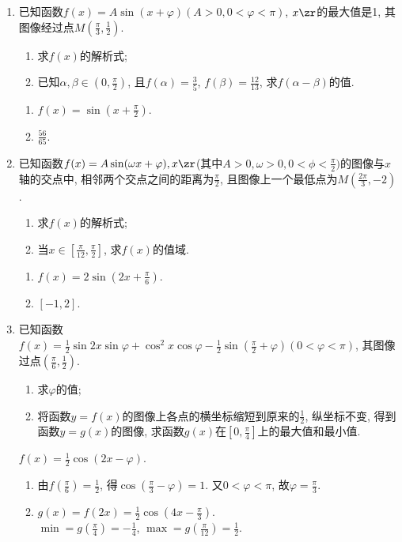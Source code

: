 \begin{enumerate}
\item 已知函数$f(x)=A\sin(x+\varphi)(A>0, 0<\varphi<\pi)$, $x\zr$的最大值是1, 其图像经过点$M\left(\frac{\pi}{3},\frac{1}{2}\right)$. 
\begin{enumerate}
\item 求$f(x)$的解析式; 
\item 已知$\alpha,\beta\in\left(0,\frac{\pi}{2}\right)$, 且$f(\alpha)=\frac{3}{5}$, $f(\beta)=\frac{12}{13}$, 求$f(\alpha-\beta)$的值. 
\end{enumerate}
\begin{jieda}
\begin{enumerate}[(1)]
\item $f(x)=\sin(x+\frac{\pi}{2})$. 
\item $\frac{56}{65}$. 
\end{enumerate}
\end{jieda}

\item 已知函数$f(x)=A\sin(\omega{x}+\varphi), x\zr$(其中$A>0, \omega>0, 0<\phi<\frac{\pi}{2})$的图像与$x$轴的交点中, 
相邻两个交点之间的距离为$\frac{\pi}{2}$, 且图像上一个最低点为$M(\frac{2\pi}{3},-2)$. 
\begin{enumerate}[(1)]
\item 求$f(x)$的解析式; 
\item 当$x\in[\frac{\pi}{12},\frac{\pi}{2}]$, 求$f(x)$的值域.
\end{enumerate}
\begin{jieda}
\begin{enumerate}[(1)]
\item $f(x)=2\sin(2x+\frac{\pi}{6})$. 
\item $[-1,2]$. 
\end{enumerate}
\end{jieda}

\item 已知函数$f(x)=\frac{1}{2}\sin2x\sin\varphi+\cos^2x\cos\varphi-\frac{1}{2}\sin\left(\frac{\pi}{2}+\varphi\right)\left(0<\varphi<\pi\right)$, 其图像过点$(\frac{\pi}{6},\frac{1}{2})$. 
\begin{enumerate}[(1)]
\item 求$\varphi$的值; 
\item 将函数$y=f(x)$的图像上各点的横坐标缩短到原来的$\frac{1}{2}$, 纵坐标不变, 得到函数$y=g(x)$的图像, 求函数$g(x)$在$[0,\frac{\pi}{4}]$上的最大值和最小值. 
\end{enumerate}
\begin{jieda}
$f(x)=\frac{1}{2}\cos(2x-\varphi)$. 
\begin{enumerate}[(1)]
\item 由$f(\frac{\pi}{6})=\frac{1}{2}$, 得$\cos(\frac{\pi}{3}-\varphi)=1$. 又$0<\varphi<\pi$, 故$\varphi=\frac{\pi}{3}$. 
\item $g(x)=f(2x)=\frac{1}{2}\cos(4x-\frac{\pi}{3})$. \\
$\min=g(\frac{\pi}{4})=-\frac{1}{4}$, $\max=g(\frac{\pi}{12})=\frac{1}{2}$. 
\end{enumerate}
\end{jieda}


\end{enumerate}
